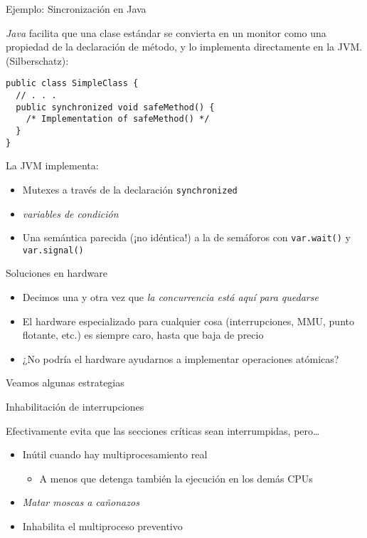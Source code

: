 \documentclass[presentation]{beamer}
\newcommand{\rarrow}{$\rightarrow$\hskip 0.5em}
\begin{document}
\begin{frame}[label={sec:orge51aa88},fragile]{Ejemplo: Sincronización en Java}
 \begin{center}
\emph{Java} facilita que una clase estándar se convierta en un monitor como
una propiedad de la declaración de método, y lo implementa
directamente en la JVM. (Silberschatz):
\end{center}
\begin{verbatim}
public class SimpleClass {
  // . . .
  public synchronized void safeMethod() {
    /* Implementation of safeMethod() */
  }
}
\end{verbatim}
La JVM implementa:
\begin{itemize}
\item Mutexes a través de la declaración \texttt{synchronized}
\item \emph{variables de condición}
\item Una semántica parecida (¡no idéntica!) a la de semáforos con
\texttt{var.wait()} y \texttt{var.signal()}
\end{itemize}
\end{frame}

\begin{frame}[label={sec:org0d7a675}]{Soluciones en hardware}
\begin{itemize}
\item Decimos una y otra vez que \emph{la concurrencia está aquí para quedarse}
\item El hardware especializado para cualquier cosa (interrupciones, MMU,
punto flotante, etc.) es siempre caro, hasta que baja de precio
\item ¿No podría el hardware ayudarnos a implementar operaciones atómicas?
\end{itemize}
\begin{center}
Veamos algunas estrategias
\end{center}
\end{frame}

\begin{frame}[label={sec:org1df1b2f}]{Inhabilitación de interrupciones}
\begin{center}
Efectivamente evita que las secciones críticas sean interrumpidas,
pero\ldots{}
\end{center}
\pause
\begin{itemize}
\item Inútil cuando hay multiprocesamiento real
\begin{itemize}
\item A menos que detenga también la ejecución en los demás CPUs
\end{itemize}
\item \emph{Matar moscas a cañonazos}
\item Inhabilita el multiproceso preventivo
\end{itemize}
\end{frame}
\end{document}
